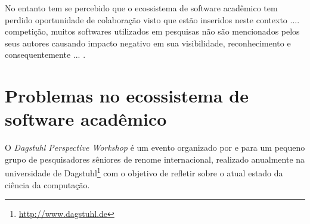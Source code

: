 

No entanto tem se percebido que o ecossistema de software acadêmico tem perdido
oportunidade de colaboração visto que estão inseridos neste contexto ....
competição, muitos softwares utilizados em pesquisas não são mencionados
pelos seus autores causando impacto negativo em sua visibilidade, reconhecimento e
consequentemente ...  \cite{howison2016software}.


\section{Problemas no ecossistema de software acadêmico}



O {\it Dagstuhl Perspective Workshop} é um evento organizado por e para um
pequeno grupo de pesquisadores sêniores de renome internacional, realizado
anualmente na universidade de Dagstuhl\footnote{\url{http://www.dagstuhl.de}}
com o objetivo de refletir sobre o atual estado da ciência da computação.

%


